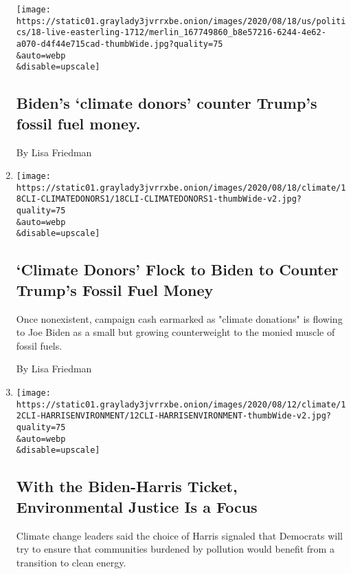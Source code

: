 \begin{enumerate}
  \texttt{[image: https://static01.graylady3jvrrxbe.onion/images/2020/08/18/us/politics/18-live-easterling-1712/merlin\_167749860\_b8e57216-6244-4e62-a070-d4f44e715cad-thumbWide.jpg?quality=75\\\&auto=webp\\\&disable=upscale]}

  \hypertarget{bidens-climate-donors-counter-trumps-fossil-fuel-money}{%
  \subsection{Biden's `climate donors' counter Trump's fossil fuel
  money.}\label{bidens-climate-donors-counter-trumps-fossil-fuel-money}}

  By Lisa Friedman
\item
  \href{/2020/08/18/climate/climate-change-biden.html}{}

  \texttt{[image: https://static01.graylady3jvrrxbe.onion/images/2020/08/18/climate/18CLI-CLIMATEDONORS1/18CLI-CLIMATEDONORS1-thumbWide-v2.jpg?quality=75\\\&auto=webp\\\&disable=upscale]}

  \hypertarget{climate-donors-flock-to-biden-to-counter-trumps-fossil-fuel-money}{%
  \subsection{`Climate Donors' Flock to Biden to Counter Trump's Fossil
  Fuel
  Money}\label{climate-donors-flock-to-biden-to-counter-trumps-fossil-fuel-money}}

  Once nonexistent, campaign cash earmarked as "climate donations" is
  flowing to Joe Biden as a small but growing counterweight to the
  monied muscle of fossil fuels.

  By Lisa Friedman
\item
  \href{/2020/08/12/climate/kamala-harris-environmental-justice.html}{}

  \texttt{[image: https://static01.graylady3jvrrxbe.onion/images/2020/08/12/climate/12CLI-HARRISENVIRONMENT/12CLI-HARRISENVIRONMENT-thumbWide-v2.jpg?quality=75\\\&auto=webp\\\&disable=upscale]}

  \hypertarget{with-the-biden-harris-ticket-environmental-justice-is-a-focus}{%
  \subsection{With the Biden-Harris Ticket, Environmental Justice Is a
  Focus}\label{with-the-biden-harris-ticket-environmental-justice-is-a-focus}}

  Climate change leaders said the choice of Harris signaled that
  Democrats will try to ensure that communities burdened by pollution
  would benefit from a transition to clean energy.


\end{enumerate}
